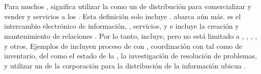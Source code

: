 
%
%

\section{\ecommerceCOM}
Para muchos \businessCOM, \ecommerceCOM significa utilizar la \internetINT como un \channelCOM de distribución para comercializar y vender \itemsCOM y servicios a los \customersCOM. Esta definición solo incluye \internetINT \commerceCOM. \ecommerceCOM abarca aún más. \ecommerceCOM es el intercambio electrónico de información, \itemsCOM, servicios, y \paymentsCOM e incluye la creación y mantenimiento de relaciones \webBasedCPT. Por lo tanto, \ecommerceCOM incluye, pero no está limitado a \internetINT, \intranetsINT, \extranetsINT, \electDataInterCOM, y otros. Ejemplos de \ecommerceCOM incluyen proceso de \transactionsDB con \electronicpayCOM, coordinación con \partnerCPT \businessCOM tal como \managementCOM  de inventario, \selfServiceCPT del \customerCOM como \trackingCPT el estado de la \orderCommerce, la investigación de resolución de problemas, y utilizar un \intranetINT de la corporación para la distribución de la información ubicua \cite{fruhling2000impact}.





